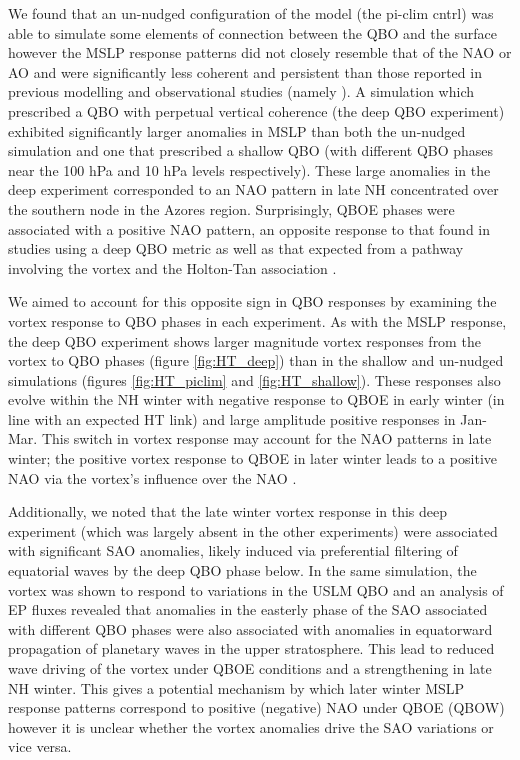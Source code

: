 We found that an un-nudged configuration of the model (the pi-clim cntrl) was able to simulate some elements of connection between the QBO and the surface however the MSLP response patterns did not closely resemble that of the NAO or AO and were significantly less coherent and persistent than those reported in previous modelling and observational studies (namely \cite{andrewsObserved2019d}). A simulation which prescribed a QBO with perpetual vertical coherence (the deep QBO experiment) exhibited significantly larger anomalies in MSLP than both the un-nudged simulation and one that prescribed a shallow QBO (with different QBO phases near the 100 hPa and 10 hPa levels respectively). These large anomalies in the deep experiment corresponded to an NAO pattern in late NH concentrated over the southern node in the Azores region. Surprisingly, QBOE phases were associated with a positive NAO pattern, an opposite response to that found in studies using a deep QBO metric \citep{andrewsObserved2019d} as well as that expected from a pathway involving the vortex and the Holton-Tan association \citep{HoltonJamesRTan1980}.

We aimed to account for this opposite sign in QBO responses by examining the vortex response to QBO phases in each experiment. As with the MSLP response, the deep QBO experiment shows larger magnitude vortex responses from the vortex to QBO phases (figure \ref{fig:HT_deep}) than in the shallow and un-nudged simulations (figures \ref{fig:HT_piclim} and \ref{fig:HT_shallow}). These responses also evolve within the NH winter with negative response to QBOE in early winter (in line with an expected HT link) and large amplitude positive responses in Jan-Mar. This switch in vortex response may account for the NAO patterns in late winter; the positive vortex response to QBOE in later winter leads to a positive NAO via the vortex's influence over the NAO \citep{charlton-perezInfluence2018e}. 

Additionally, we noted that the late winter vortex response in this deep experiment (which was largely absent in the other experiments) were associated with significant SAO anomalies, likely induced via preferential filtering of equatorial waves by the deep QBO phase below. In the same simulation, the vortex was shown to respond to variations in the USLM QBO and an analysis of EP fluxes revealed that anomalies in the easterly phase of the SAO associated with different QBO phases were also associated with anomalies in equatorward propagation of planetary waves in the upper stratosphere. This lead to reduced wave driving of the vortex under QBOE conditions and a strengthening in late NH winter. This gives a potential mechanism by which later winter MSLP response patterns correspond to positive (negative) NAO under QBOE (QBOW) however it is unclear whether the vortex anomalies drive the SAO variations or vice versa.

